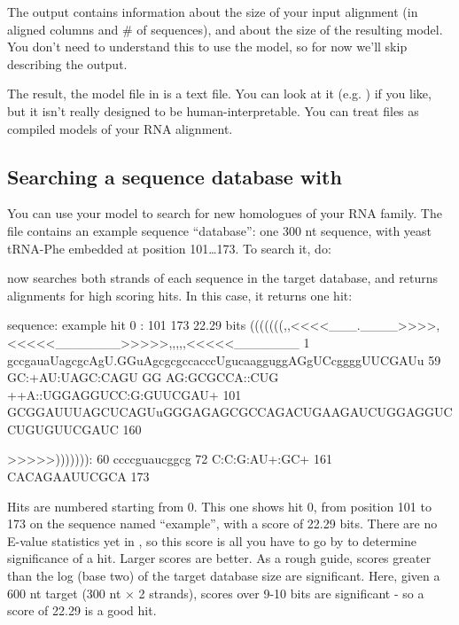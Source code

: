 The output  contains information about the size of your
input alignment (in aligned columns and \# of sequences), and about
the size of the resulting model. You don't need to understand this to
use the model, so for now we'll skip describing the output. 

The result, the model file in  is a text file. You can
look at it (e.g. ) if you like, but it isn't really
designed to be human-interpretable. You can treat  files as
compiled models of your RNA alignment.

\subsection{Searching a sequence database with }

You can use your model to search for new homologues of your RNA
family. The file  contains an example sequence
``database'': one 300 nt sequence, with yeast tRNA-Phe embedded at
position 101\ldots173. To search it, do:


 now searches both strands of each sequence in the
target database, and returns alignments for high scoring hits.  In
this case, it returns one hit:

\begin{sreoutput}
sequence: example
hit 0   :    101    173    22.29 bits
           (((((((,,<<<<___.____>>>>,<<<<<_______>>>>>,,,,,<<<<<_______
         1 gccgauaUagcgcAgU.GGuAgcgcgccacccUgucaagguggAGgUCcggggUUCGAUu 59      
           GC:+AU:UAGC:CAGU GG AG:GCGCCA::CUG ++A::UGGAGGUCC:G:GUUCGAU+
       101 GCGGAUUUAGCUCAGUuGGGAGAGCGCCAGACUGAAGAUCUGGAGGUCCUGUGUUCGAUC 160     

           >>>>>))))))):
        60 ccccguaucggcg 72      
           C:C:G:AU+:GC+
       161 CACAGAAUUCGCA 173     
\end{sreoutput}

Hits are numbered starting from 0. This one shows hit 0, from position
101 to 173 on the sequence named ``example'', with a score of 22.29
bits. There are no E-value statistics yet in , so
this score is all you have to go by to determine significance of a
hit.  Larger scores are better. As a rough guide, scores greater than
the log (base two) of the target database size are significant.  Here,
given a 600 nt target (300 nt $\times$ 2 strands), scores over 9-10
bits are significant - so a score of 22.29 is a good hit. 

